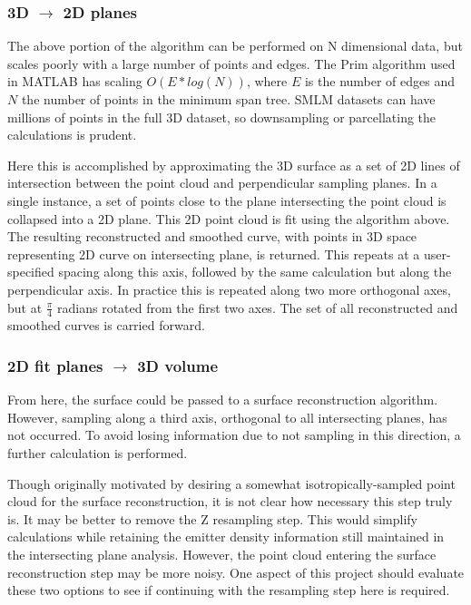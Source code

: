 \documentclass[10pt,a4paper]{article}
\begin{document}
\subsubsection{3D $\rightarrow$ 2D planes}

The above portion of the algorithm can be performed on N dimensional data, but scales poorly with a large number of points and edges.  The Prim algorithm used in MATLAB has scaling $O(E*log(N))$, where $E$ is the number of edges and $N$ the number of points in the minimum span tree.  SMLM datasets can have millions of points in the full 3D dataset, so downsampling or parcellating the calculations is prudent. 

Here this is accomplished by approximating the 3D surface as a set of 2D lines of intersection between the point cloud and perpendicular sampling planes.  In a single instance, a set of points close to the plane intersecting the point cloud is collapsed into a 2D plane.  This 2D point cloud is fit using the algorithm above.  The resulting reconstructed and smoothed curve, with points in 3D space representing 2D curve on intersecting plane, is returned.  This repeats at a user-specified spacing along this axis, followed by the same calculation but along the perpendicular axis.  In practice this is repeated along two more orthogonal axes, but at $\frac{\pi}{4}$ radians rotated from the first two axes.  The set of all reconstructed and smoothed curves is carried forward. 

\subsubsection{2D fit planes $\rightarrow$ 3D volume}

From here, the surface could be passed to a surface reconstruction algorithm.  However, sampling along a third axis, orthogonal to all intersecting planes, has not occurred.  To avoid losing information due to not sampling in this direction, a further calculation is performed. 

Though originally motivated by desiring a somewhat isotropically-sampled point cloud for the surface reconstruction, it is not clear how necessary this step truly is.  It may be better to remove the Z resampling step.  This would simplify calculations while retaining the emitter density information still maintained in the intersecting plane analysis.  However, the point cloud entering the surface reconstruction step may be more noisy.  One aspect of this project should evaluate these two options to see if continuing with the resampling step here is required.  
\end{document}
